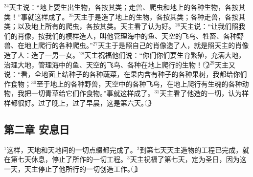 $^{24}$天主说：“地上要生出生物，各按其类；走兽、爬虫和地上的各种生物，各按其类！”事就这样成了。$^{25}$天主于是造了地上的生物，各按其类；各种走兽，各按其类；以及地上所有的爬虫，各按其类。天主看了认为好。$^{26}$天主说：“让我们照我们的肖像，按我们的模样造人，叫他管理海中的鱼、天空的飞鸟、牲畜、各种野兽、在地上爬行的各种爬虫。”$^{27}$天主于是照自己的肖像造了人，就是照天主的肖像造了人：造了一男一女。$^{28}$天主祝福他们说：“你们你们要生育繁殖，充满大地，治理大地，管理海中的鱼、天空的飞鸟、各种在地上爬行的生物！”\textcircled{2}$^{29}$天主又说：“看，全地面上结种子的各种蔬菜，在果内含有种子的各种果树，我都给你们作食物；$^{30}$至于地上的各种野兽，天空中的各种飞鸟，在地上爬行有生魂的各种动物，我把一切青草给它们作食物。”事就这样成了。$^{31}$天主看了他造的一切，认为样样都很好。过了晚上，过了早晨，这是第六天。\textcircled{3}


\subsection{第二章 安息日}
$^{1}$这样，天地和天地间的一切点缀都完成了。$^{2}$到第七天天主造物的工程已完成，就在第七天休息，停止了所作的一切工程。$^{3}$天主祝福了第七天，定为圣日，因为这一天，天主停止了他所行的一切创造工作。\textcircled{1}


